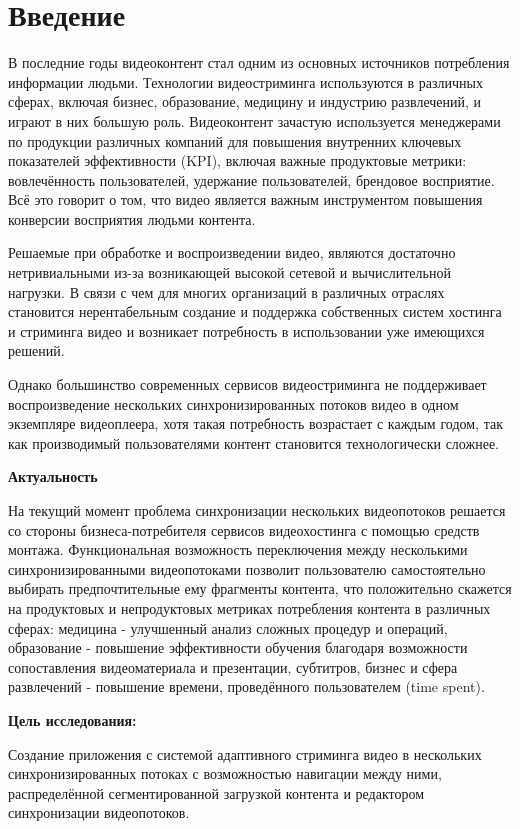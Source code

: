 \chapter*{Введение} %

	В последние годы видеоконтент стал одним из основных источников потребления информации людьми. Технологии видеостриминга используются в различных сферах, включая бизнес, образование, медицину и индустрию развлечений, и играют в них большую роль. Видеоконтент зачастую используется менеджерами по продукции различных компаний для повышения внутренних ключевых показателей эффективности (KPI), включая важные продуктовые метрики: вовлечённость пользователей, удержание пользователей, брендовое восприятие. Всё это говорит о том, что видео является важным инструментом повышения конверсии восприятия людьми контента.

	Решаемые при обработке и воспроизведении видео, являются достаточно нетривиальными из-за возникающей высокой сетевой и вычислительной нагрузки. В связи с чем для многих организаций в различных отраслях становится нерентабельным создание и поддержка собственных систем хостинга и стриминга видео и возникает потребность в использовании уже имеющихся решений.

	Однако большинство современных сервисов видеостриминга не поддерживает воспроизведение нескольких синхронизированных потоков видео в одном экземпляре видеоплеера, хотя такая потребность возрастает с каждым годом, так как производимый пользователями контент становится технологически сложнее.
	
	\textbf{Актуальность}
	
	На текущий момент проблема синхронизации нескольких видеопотоков решается со стороны бизнеса-потребителя сервисов видеохостинга с помощью средств монтажа. Функциональная возможность переключения между несколькими синхронизированными видеопотоками позволит пользователю самостоятельно выбирать предпочтительные ему фрагменты контента, что положительно скажется на продуктовых и непродуктовых метриках потребления контента в различных сферах: медицина - улучшенный анализ сложных процедур и операций, образование - повышение эффективности обучения благодаря возможности сопоставления видеоматериала и презентации, субтитров, бизнес и сфера развлечений - повышение времени, проведённого пользователем (time spent).
	
	\textbf{Цель исследования:}
	
	Создание приложения с системой адаптивного стриминга видео в нескольких синхронизированных потоках с возможностью навигации между ними, распределённой сегментированной загрузкой контента и редактором синхронизации видеопотоков.

